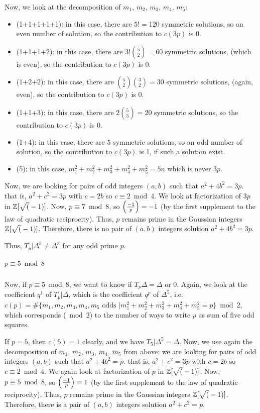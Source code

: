 Now, we look at the decomposition of $m_1$, $m_2$, $m_3$, $m_4$, $m_5$:
\begin{itemize}
	\item (1+1+1+1+1): in this case, there are $5!=120$ symmetric solutions, so an even number of solution, so the contribution to $c(3p)$ is 0.
	\item (1+1+1+2): in this case, there are $3!\binom{5}{2}=60$ symmetric solutions, (which is even), so the contribution to $c(3p)$ is 0.
	\item (1+2+2): in this case, there are $\binom{5}{2}\binom{3}{2}=30$ symmetric solutions, (again, even), so the contribution to $c(3p)$ is 0.
	\item (1+1+3): in this case, there are $2\binom{5}{3}=20$ symmetric solutions, so the contribution to $c(3p)$ is 0.
	\item (1+4): in this case, there are $5$ symmetric solutions, so an odd number of solution, so the contribution to $c(3p)$ is 1, if such a solution exist.
	\item (5): in this case, $m_1^2 + m_2^2 + m_3^2 + m_4^2 + m_5^2 = 5n$ which is never $3p$.
\end{itemize}

Now, we are looking for pairs of odd integers $(a,b)$ such that $a^2+4b^2=3p$.
that is, $a^2+c^2=3p$ with $c=2b$ so $c \equiv 2 \bmod 4$.
We look at factorization of $3p$ in $\mathbb{Z}[\sqrt(-1)]$.
Now, $p \equiv 7 \bmod 8$, so $\left( \frac{-1}{p} \right)=-1$ (by the first supplement to the law of quadratic reciprocity).
Thus, $p$ remains prime in the Gaussian integers $\mathbb{Z}[\sqrt(-1)]$.
Therefore, there is no pair of $(a,b)$ integers solution $a^2+4b^2=3p$.

Thus, $T_p|\Delta^5 \neq \Delta^3$ for any odd prime $p$.

\subparagraph{$p \equiv 5 \bmod 8$}
Now, if $p \equiv 5 \bmod 8$, we want to know if $T_p\Delta = \Delta \text{ or } 0$.
Again, we look at the coefficient $q^1$ of $T_p|\Delta$, which is the coefficient $q^p$ of $\Delta^5$, i.e. $c(p)= \#\{ m_1, m_2, m_3, m_4, m_5 \text{ odds } | m_1^2 + m_2^2 + m_3^2 + m_4^2 + m_5^2 = p \} \bmod 2$, which corresponds ($\bmod 2$) to the number of ways to write $p$ as sum of five odd squares.

If $p=5$, then $c(5)=1$ clearly, and we have $T_5|\Delta^5=\Delta$.
Now, we use again the decomposition of $m_1$, $m_2$, $m_3$, $m_4$, $m_5$ from above: we are looking for pairs of odd integers $(a,b)$ such that $a^2+4b^2=p$.
that is, $a^2+c^2=3p$ with $c=2b$ so $c \equiv 2 \bmod 4$.
We again look at factorization of $p$ in $\mathbb{Z}[\sqrt(-1)]$.
Now, $p \equiv 5 \bmod 8$, so $\left( \frac{-1}{p} \right)=1$ (by the first supplement to the law of quadratic reciprocity).
Thus, $p$ remains prime in the Gaussian integers $\mathbb{Z}[\sqrt(-1)]$.
Therefore, there is a pair of $(a,b)$ integers solution $a^2+c^2=p$.

